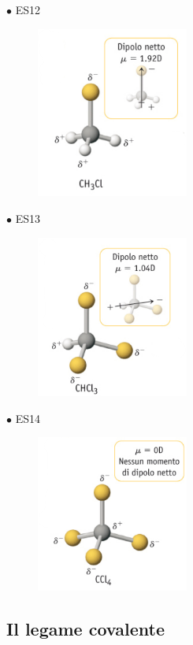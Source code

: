 $\bullet$ ES12

\begin{figure}[htp]
    \centering
    \includegraphics[width=5cm]{immagini/CH_3Cl.png}
\end{figure}

$\bullet$ ES13

\begin{figure}[htp]
    \centering
    \includegraphics[width=5cm]{immagini/CHCl_3.png}
\end{figure}

$\bullet$ ES14

\begin{figure}[htp]
    \centering
    \includegraphics[width=5cm]{immagini/CCl_4.png}
\end{figure}


\subsection{Il legame covalente}